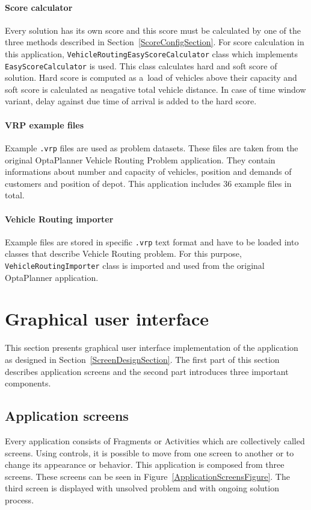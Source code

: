 \paragraph{Score calculator}
Every solution has its own score and this score must be calculated by one of the three methods described in
Section~\ref{ScoreConfigSection}. For score calculation in this application, \texttt{VehicleRoutingEasyScoreCalculator}
class which implements \texttt{EasyScoreCalculator} is used. This class calculates hard and soft score of solution. Hard
score is computed as a~load of vehicles above their capacity and soft score is calculated as neagative total vehicle
distance. In case of time window variant, delay against due time of arrival is added to the hard score.

\paragraph{VRP example files}
Example \texttt{.vrp} files are used as problem datasets. These files are taken from the original OptaPlanner Vehicle
Routing Problem application. They contain informations about number and capacity of vehicles, position and demands of
customers and position of depot. This application includes 36 example files in total.

\paragraph{Vehicle Routing importer}
Example files are stored in specific \texttt{.vrp} text format and have to be loaded into classes that describe Vehicle
Routing problem. For this purpose, \texttt{VehicleRoutingImporter} class is imported and used from the original
OptaPlanner application.

\section{Graphical user interface}\label{GuiSection}
This section presents graphical user interface implementation of the application as designed in
Section~\ref{ScreenDesignSection}. The first part of this section describes application screens and the second part
introduces three important components.

\subsection{Application screens}
Every application consists of Fragments or Activities which are collectively called screens. Using controls, it is
possible to move from one screen to another or to change its appearance or behavior. This application is composed from
three screens. These screens can be seen in Figure~\ref{ApplicationScreensFigure}. The third screen is displayed with
unsolved problem and with ongoing solution process.

